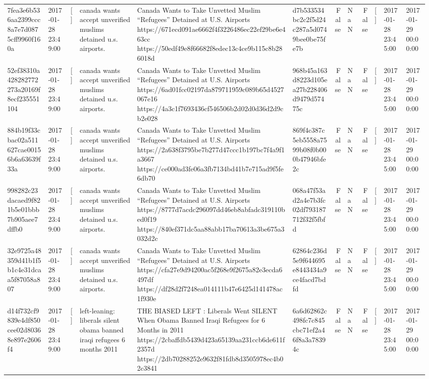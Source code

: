 \begin{tabular}{llllllrlrlll}
7fea3e6b536aa2399ccc8a7e7d0875cff9960f160a & 2017-01-28 23:49:00 & [] & canada wants accept unverified muslims detained u.s. airports. & Canada Wants to Take Unvetted Muslim “Refugees” Detained at U.S. Airports https://671ecd091ae6662f4f3226486ec22ef29be6e463cc https://50edf49e8f66682f8edec13c4ce9b115c8b286018d & d7b533534bc2c2f5d24c287a5d0749bee0be75fe7b & False & NaN & False & [] & 2017-01-28 23:45:00 & 2017-01-29 00:00:00 \\
52ef38310a428282772273a20169f8ecf235551104 & 2017-01-28 23:49:00 & [] & canada wants accept unverified muslims detained u.s. airports. & Canada Wants to Take Unvetted Muslim “Refugees” Detained at U.S. Airports https://6ad01fcc02197da879711959c089b65d4527067e16 https://4a3c1f7693436cf546506b2d02d0d36d2d9cb2e028 & 968b45a163d8223d105ea27b228406d9479d57475c & False & NaN & False & [] & 2017-01-28 23:45:00 & 2017-01-29 00:00:00 \\
884b19f33cbac02a511627cae00156b6a63639f33a & 2017-01-28 23:49:00 & [] & canada wants accept unverified muslims detained u.s. airports. & Canada Wants to Take Unvetted Muslim “Refugees” Detained at U.S. Airports https://2a638f3795be7b277d47ccc1b197bc7f4a9f1a3667 https://ce000ad3fe06a3fb7134bd41b7e715ad9f5fe6db70 & 869f4c387c5eb5558a7599b08f0b000b47946bfe2c & False & NaN & False & [] & 2017-01-28 23:45:00 & 2017-01-29 00:00:00 \\
998282c23dacaed9f821b5e01bbb7b905aee7dffb0 & 2017-01-28 23:49:00 & [] & canada wants accept unverified muslims detained u.s. airports. & Canada Wants to Take Unvetted Muslim “Refugees” Detained at U.S. Airports https://8777d7acdc296097dd46eb8abfadc319110bed0f19 https://840ef371dc5aa88abb17ba70613a3be675a3032d2c & 068a47f53ad2a4e7b3fc02df793187712f32f5fbfd & False & NaN & False & [] & 2017-01-28 23:45:00 & 2017-01-29 00:00:00 \\
32e9725a48359d41b1f5b1c4e31dcaa5f87058a807 & 2017-01-28 23:49:00 & [] & canada wants accept unverified muslims detained u.s. airports. & Canada Wants to Take Unvetted Muslim “Refugees” Detained at U.S. Airports https://cfa27e9d94200ac5f268e9f2675a82e3ecda6497df https://df28d2f7248ea014111b47e6425d141478ac1f930e & 62864c236d5e9f644695e8443434a9ce4facd7bdfd & False & NaN & False & [] & 2017-01-28 23:45:00 & 2017-01-29 00:00:00 \\
d14f732cf9839e4df850cee02d80368e897e2606f4 & 2017-01-28 23:49:00 & [] & left-leaning: liberals silent obama banned iraqi refugees 6 months 2011 & THE BIASED LEFT : Liberals Went SILENT When Obama Banned Iraqi Refugees for 6 Months in 2011 https://2cbaffdb5439d423a65139aa231ccb6de611f2357d https://2db70288252e9632f81fdb8d3505978ec4b02c3841 & 6a6d62862c498fc7c845cbc71ef2a46f8a3a78394c & False & NaN & False & [] & 2017-01-28 23:45:00 & 2017-01-29 00:00:00 \\

\end{tabular}
